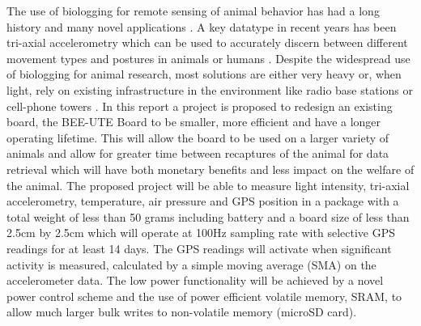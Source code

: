 \documentclass[12pt,openany,a4paper]{book}
\begin{document}
The use of biologging for remote sensing of animal behavior has had a long history and many novel applications \cite{Coudert05}. A key datatype in recent years has been tri-axial accelerometry \cite{Ran12,Shepard08} which can be used to accurately discern between different movement types and postures in animals or humans \cite{Lamprecht14,Terrill13}. Despite the widespread use of biologging for animal research, most solutions are either very heavy \cite{Marshall07} or, when light, rely on existing infrastructure in the environment like radio base stations \cite{Jurdak13} or cell-phone towers \cite{Bennett11}. In this report a project is proposed to redesign an existing board, the BEE-UTE Board \cite{Freakley13} to be smaller, more efficient and have a longer operating lifetime. This will allow the board to be used on a larger variety of animals and allow for greater time between recaptures of the animal for data retrieval which will have both monetary benefits and less impact on the welfare of the animal. The proposed project will be able to measure light intensity, tri-axial accelerometry, temperature, air pressure and GPS position in a package with a total weight of less than 50 grams including battery and a board size of less than 2.5cm by 2.5cm which will operate at 100Hz sampling rate with selective GPS readings for at least 14 days. The GPS readings will activate when significant activity is measured, calculated by a simple moving average (SMA) on the accelerometer data. The low power functionality will be achieved by a novel power control scheme and the use of power efficient volatile memory, SRAM, to allow much larger bulk writes to non-volatile memory (microSD card).

\tableofcontents

\listoffigures
{}

\listoftables
{}

% 

\cleardoublepage

\mainmatter


%
%
%
%	
%	
\end{document}
